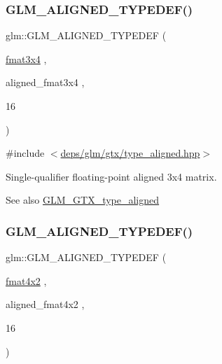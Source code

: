 \subsubsection{\texorpdfstring{G\+L\+M\+\_\+\+A\+L\+I\+G\+N\+E\+D\+\_\+\+T\+Y\+P\+E\+D\+E\+F()}{GLM\_ALIGNED\_TYPEDEF()}\hspace{0.1cm}{\footnotesize\ttfamily [177/209]}}
{\footnotesize\ttfamily glm\+::\+G\+L\+M\+\_\+\+A\+L\+I\+G\+N\+E\+D\+\_\+\+T\+Y\+P\+E\+D\+EF (\begin{DoxyParamCaption}\item[{\hyperlink{group__gtc__type__precision_gab2daf8468a8b9343c065816df07e29fe}{fmat3x4}}]{,  }\item[{aligned\+\_\+fmat3x4}]{,  }\item[{16}]{ }\end{DoxyParamCaption})}



{\ttfamily \#include $<$\hyperlink{gtx_2type__aligned_8hpp}{deps/glm/gtx/type\+\_\+aligned.\+hpp}$>$}

Single-\/qualifier floating-\/point aligned 3x4 matrix. \begin{DoxySeeAlso}{See also}
\hyperlink{group__gtx__type__aligned}{G\+L\+M\+\_\+\+G\+T\+X\+\_\+type\+\_\+aligned} 
\end{DoxySeeAlso}
\mbox{\label{group__gtx__type__aligned_ga93f09768241358a287c4cca538f1f7e7}} 
\subsubsection{\texorpdfstring{G\+L\+M\+\_\+\+A\+L\+I\+G\+N\+E\+D\+\_\+\+T\+Y\+P\+E\+D\+E\+F()}{GLM\_ALIGNED\_TYPEDEF()}\hspace{0.1cm}{\footnotesize\ttfamily [178/209]}}
{\footnotesize\ttfamily glm\+::\+G\+L\+M\+\_\+\+A\+L\+I\+G\+N\+E\+D\+\_\+\+T\+Y\+P\+E\+D\+EF (\begin{DoxyParamCaption}\item[{\hyperlink{group__gtc__type__precision_ga279cf309f0098c3d26ce88fe8a26375a}{fmat4x2}}]{,  }\item[{aligned\+\_\+fmat4x2}]{,  }\item[{16}]{ }\end{DoxyParamCaption})}



